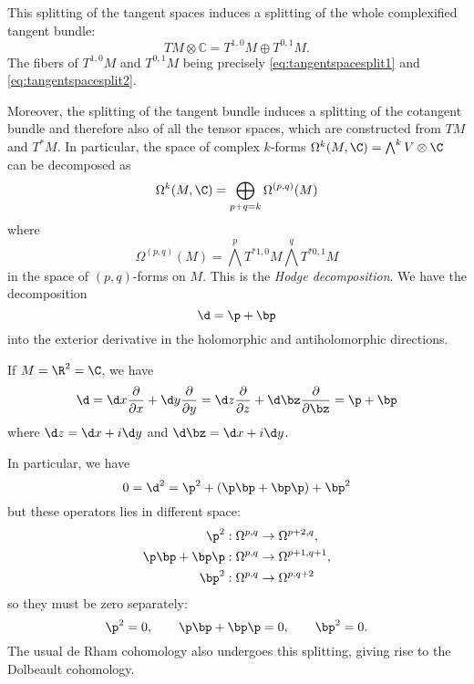 \documentclass{worksheetclass}
\begin{document}
        This splitting of the tangent spaces induces a splitting of the whole complexified tangent bundle:
        \begin{equation}
            TM\otimes \mathbb{C} =T^{1,0}M\oplus T^{0,1}M.
        \end{equation}
        The fibers of $T^{1,0}M$ and $T^{0,1}M$ being precisely \eqref{eq:tangentspacesplit1} and \eqref{eq:tangentspacesplit2}.

        Moreover, the splitting of the tangent bundle induces a splitting of the cotangent bundle and therefore also of all the tensor spaces, which are constructed from $TM$ and $T^*M$. In particular, the space of complex $k$-forms $\Omega^k(M,\C)={\textstyle\bigwedge^k V}\otimes\C$ can be decomposed as
        \begin{equation*}
            \Omega^k(M,\C) = \bigoplus_{p+q=k}\Omega^{(p,q)}(M)
        \end{equation*}
        where
        \begin{equation*}
            \Omega^{(p,q)}(M) = \bigwedge^pT^{*1,0}M\bigwedge^qT^{*0,1}M
        \end{equation*}
        in the space of $(p,q)$-forms on $M$. This is the \emph{Hodge decomposition}. We have the decomposition
        \begin{equation}
            \d= \p + \bp
        \end{equation}
        into the exterior derivative in the holomorphic and antiholomorphic directions.
        \begin{examp}
            If $M=\R^2=\C$, we have
            \begin{equation}
                \d=\d x \pdv{}{x}+\d y \pdv{}{y} = \d z\pdv{}{z}+\d\bz\pdv{}{\bz}=\p+\bp
            \end{equation}
            where $\d z=\d x+i\d y$ and $\d\bz =\d x+i\d y$.
        \end{examp}
        In particular, we have
        \begin{equation}
            0 = \d^2 = \p^2 + (\p\bp+\bp\p) + \bp^2
        \end{equation}
        but these operators lies in different space:
        \begin{align}
            \p^2&:\Omega^{p,q}\to\Omega^{p+2,q},\\
            \p\bp+\bp\p&:\Omega^{p,q}\to\Omega^{p+1,q+1},\\
            \bp^2&:\Omega^{p,q}\to\Omega^{p,q+2}
        \end{align}
        so they must be zero separately:
        \begin{equation}
            \p^2=0,\qquad \p\bp+\bp\p=0,\qquad \bp^2=0.
        \end{equation}
        The usual de Rham cohomology also undergoes this splitting, giving rise to the Dolbeault cohomology.
\end{document}
